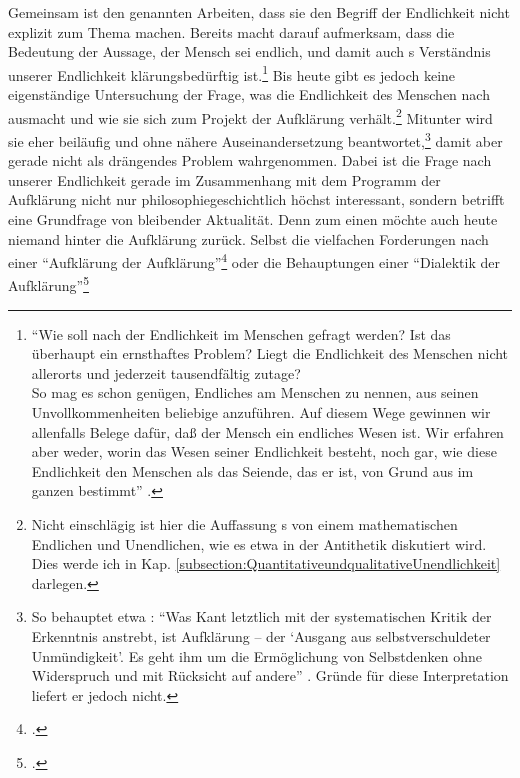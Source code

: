 Gemeinsam ist den genannten Arbeiten, dass sie den Begriff der Endlichkeit nicht
explizit zum Thema machen. Bereits 
macht darauf aufmerksam, dass die Bedeutung der Aussage, der Mensch
sei endlich, und damit auch s Verständnis
unserer Endlichkeit klärungsbedürftig ist.\footnote{\enquote{Wie soll nach der Endlichkeit im
Menschen gefragt werden? Ist das überhaupt ein ernsthaftes Problem? Liegt die
Endlichkeit des Menschen nicht allerorts und jederzeit tausendfältig zutage?\\
So mag es schon genügen, Endliches am Menschen zu nennen, aus seinen
Unvollkommenheiten beliebige anzuführen. Auf diesem Wege gewinnen
wir allenfalls Belege dafür, daß der Mensch ein endliches Wesen
ist. Wir erfahren aber weder, worin das Wesen seiner Endlichkeit
besteht, noch gar, wie diese Endlichkeit den Menschen als das
Seiende, das er ist, von Grund aus im ganzen
bestimmt} \parencite[][198]{Heidegger:KantunddasProblemderMetaphysik1965}.} Bis
heute gibt es jedoch keine eigenständige Untersuchung der Frage, was die
Endlichkeit des Menschen nach  ausmacht und wie sie sich
zum Projekt der Aufklärung verhält.\footnote{Nicht einschlägig ist hier die
Auffassung s von einem mathematischen Endlichen und
Unendlichen, wie es etwa in der Antithetik diskutiert wird. Dies werde ich in
Kap. \ref{subsection:QuantitativeundqualitativeUnendlichkeit} darlegen.}
Mitunter wird sie eher beiläufig und ohne nähere Auseinandersetzung
beantwortet,\footnote{So behauptet etwa
  :
\enquote{Was Kant letztlich mit der systematischen Kritik der Erkenntnis
anstrebt, ist Aufklärung -- der \enquote{Ausgang aus selbstverschuldeter
Unmündigkeit}. Es geht ihm um die Ermöglichung von Selbstdenken ohne Widerspruch
und mit Rücksicht auf andere}
\parencite[][93]{Sandkuehler:KantsenquoteRevolutionderDenkungsart2005}. Gründe
für diese Interpretation liefert er jedoch nicht.} damit aber gerade nicht als
drängendes Problem wahrgenommen. Dabei ist die Frage nach unserer Endlichkeit
gerade im Zusammenhang mit dem Programm der Aufklärung nicht nur
philosophiegeschichtlich höchst interessant, sondern betrifft eine Grundfrage
von bleibender Aktualität. Denn zum einen möchte auch heute niemand hinter die
Aufklärung zurück. Selbst die vielfachen Forderungen nach einer
\enquote{Aufklärung der Aufklärung}\footcite[Vgl.][]{Gutschmidt:AufklaerungderAufklaerung2012} oder die
Behauptungen einer \enquote{Dialektik der
Aufklärung}\footcite[Vgl.][]{Horkheimer:DialektikderAufklaerung1997}
